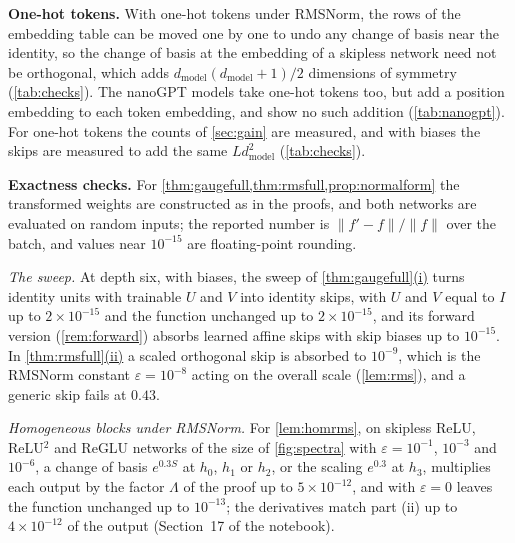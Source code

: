 \documentclass[10pt]{article}
\theoremstyle{definition}
\theoremstyle{remark}
\newcommand{\dm}{d_{\mathrm{model}}}
\newcommand{\norm}[1]{\lVert #1\rVert}
\newcommand{\para}[1]{\smallskip\noindent\textbf{#1}\hspace{0.5em}}
\DeclareRobustCommand{\cpref}[2]{\hyperref[#1:#2]{\cref*{#1}(#2)}}
\begin{document}
\para{One-hot tokens.} With one-hot tokens under RMSNorm, the rows of the embedding table can be moved one by one to undo any change of basis near the identity, so the change of basis at the embedding of a skipless network need not be orthogonal, which adds $\dm(\dm+1)/2$ dimensions of symmetry (\cref{tab:checks}). The nanoGPT models take one-hot tokens too, but add a position embedding to each token embedding, and show no such addition (\cref{tab:nanogpt}). For one-hot tokens the counts of \cref{sec:gain} are measured, and with biases the skips are measured to add the same $L\dm^2$ (\cref{tab:checks}).

\para{Exactness checks.} For \cref{thm:gaugefull,thm:rmsfull,prop:normalform} the transformed weights are constructed as in the proofs, and both networks are evaluated on random inputs; the reported number is $\norm{f' - f}/\norm{f}$ over the batch, and values near $10^{-15}$ are floating-point rounding.

\emph{The sweep.} At depth six, with biases, the sweep of \cpref{thm:gaugefull}{i} turns identity units with trainable $U$ and $V$ into identity skips, with $U$ and $V$ equal to $I$ up to $2\times10^{-15}$ and the function unchanged up to $2\times10^{-15}$, and its forward version (\cref{rem:forward}) absorbs learned affine skips with skip biases up to $10^{-15}$. In \cpref{thm:rmsfull}{ii} a scaled orthogonal skip is absorbed to $10^{-9}$, which is the RMSNorm constant $\varepsilon = 10^{-8}$ acting on the overall scale (\cref{lem:rms}), and a generic skip fails at $0.43$.

\emph{Homogeneous blocks under RMSNorm.} For \cref{lem:homrms}, on skipless ReLU, ReLU$^2$ and ReGLU networks of the size of \cref{fig:spectra} with $\varepsilon = 10^{-1}$, $10^{-3}$ and $10^{-6}$, a change of basis $e^{0.3S}$ at $h_0$, $h_1$ or $h_2$, or the scaling $e^{0.3}$ at $h_3$, multiplies each output by the factor $\Lambda$ of the proof up to $5\times10^{-12}$, and with $\varepsilon = 0$ leaves the function unchanged up to $10^{-13}$; the derivatives match part (ii) up to $4\times10^{-12}$ of the output (Section~17 of the notebook).
\end{document}
